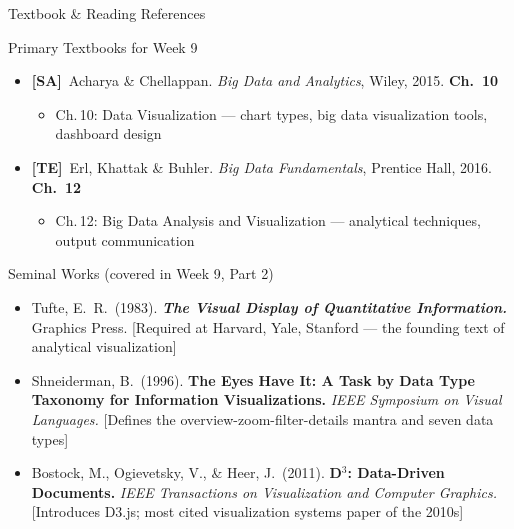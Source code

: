 \documentclass[aspectratio=169,10pt]{beamer}
\begin{document}
\begin{frame}{Textbook \& Reading References}
  \begin{block}{Primary Textbooks for Week 9}
    \begin{itemize}
      \item \textbf{[SA]}\ Acharya \& Chellappan. \textit{Big Data and Analytics}, Wiley, 2015.
            \hfill\textbf{Ch.\ 10}
            \begin{itemize}
              \small\item Ch.\,10: Data Visualization --- chart types, big data visualization tools, dashboard design
            \end{itemize}
      \item \textbf{[TE]}\ Erl, Khattak \& Buhler. \textit{Big Data Fundamentals}, Prentice Hall, 2016.
            \hfill\textbf{Ch.\ 12}
            \begin{itemize}
              \small\item Ch.\,12: Big Data Analysis and Visualization --- analytical techniques, output communication
            \end{itemize}
    \end{itemize}
  \end{block}
  \vspace{4pt}
  \begin{exampleblock}{Seminal Works (covered in Week 9, Part 2)}
    \begin{itemize}
      \small
      \item Tufte, E.\ R.\ (1983). \textbf{\textit{The Visual Display of Quantitative Information.}} Graphics Press. [Required at Harvard, Yale, Stanford --- the founding text of analytical visualization]
      \item Shneiderman, B.\ (1996). \textbf{The Eyes Have It: A Task by Data Type Taxonomy for Information Visualizations.} \textit{IEEE Symposium on Visual Languages.} [Defines the overview-zoom-filter-details mantra and seven data types]
      \item Bostock, M., Ogievetsky, V., \& Heer, J.\ (2011). \textbf{D$^3$: Data-Driven Documents.} \textit{IEEE Transactions on Visualization and Computer Graphics.} [Introduces D3.js; most cited visualization systems paper of the 2010s]
    \end{itemize}
  \end{exampleblock}
\end{frame}
\end{document}
